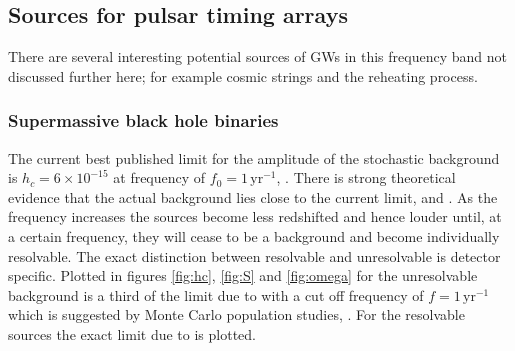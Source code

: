 \subsection{Sources for pulsar timing arrays}
There are several interesting potential sources of GWs in this frequency band not discussed further here; for example cosmic strings and the reheating process.

\subsubsection{Supermassive black hole binaries}
The current best published limit for the amplitude of the stochastic background is $h_{c}=6\times 10^{-15}$ at frequency of $f_{0}=1\,\textrm{yr}^{-1}$, \cite{Haasteren}. There is strong theoretical evidence that the actual background lies close to the current limit, \cite{imminentdetectionofgravitationalwaves} and \cite{NONimminentdetectionofgravitationalwaves}. As the frequency increases the sources become less redshifted and hence louder until, at a certain frequency, they will cease to be a background and become individually resolvable. The exact distinction between resolvable and unresolvable is detector specific. Plotted in figures \ref{fig:hc}, \ref{fig:S} and \ref{fig:omega} for the unresolvable background is a third of the limit due to \cite{Haasteren} with a cut off frequency of $f=1\,\textrm{yr}^{-1}$ which is suggested by Monte Carlo population studies, \cite{SesanaVecchioColancino}. For the resolvable sources the exact limit due to \cite{Haasteren} is plotted.

